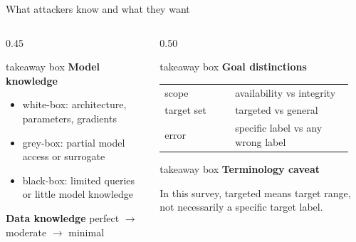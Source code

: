 \begin{frame}{What attackers know and what they want}
  \begin{columns}[T,onlytextwidth]
    \begin{column}{0.45\textwidth}
      \begin{beamercolorbox}[wd=\linewidth,rounded=true,sep=0.50em]{takeaway box}
        {\color{PresThreeAttack}\bfseries Model knowledge}\par
        {\small
        \begin{itemize}
          \item white-box: architecture, parameters, gradients
          \item grey-box: partial model access or surrogate
          \item black-box: limited queries or little model knowledge
        \end{itemize}
        }
        \vspace{0.15em}
        {\color{PresThreeAttack}\bfseries Data knowledge}\quad
        {\small perfect \(\rightarrow\) moderate \(\rightarrow\) minimal}
      \end{beamercolorbox}
    \end{column}
    \begin{column}{0.50\textwidth}
      \begin{beamercolorbox}[wd=\linewidth,rounded=true,sep=0.50em]{takeaway box}
        {\color{PresThreeAttack}\bfseries Goal distinctions}\par
        \vspace{0.15em}
        {\small
        \begin{tabular}{@{}p{0.34\linewidth}p{0.58\linewidth}@{}}
          \toprule
          scope & availability vs integrity \\
          target set & targeted vs general \\
          error & specific label vs any wrong label \\
          \bottomrule
        \end{tabular}
        }
      \end{beamercolorbox}
      \vspace{0.30em}
      \begin{beamercolorbox}[wd=\linewidth,rounded=true,sep=0.50em]{takeaway box}
        {\color{PresThreeDefense}\bfseries Terminology caveat}\par
        {\small In this survey, targeted means target range, not necessarily a specific target label.}
      \end{beamercolorbox}
    \end{column}
  \end{columns}
\end{frame}

